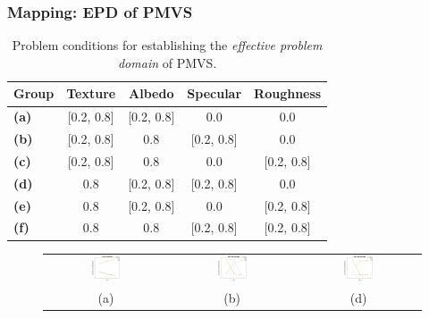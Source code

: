 \documentclass{beamer}
\begin{document}
\begin{frame}
\frametitle{Mapping: EPD of PMVS}

\begin{table}[!htbp]
  \centering
  \caption{Problem conditions for establishing the \textit{effective problem domain} of PMVS.}
  \begin{tabular}{l*{4}{c}}
  \hline
  \textbf{Group} & Texture & Albedo & Specular & Roughness\\
  \hline
  \textbf{(a)} & [0.2, 0.8] & [0.2, 0.8] & 0.0 & 0.0\\
  \textbf{(b)} & [0.2, 0.8] & 0.8 & [0.2, 0.8] & 0.0\\
  \textbf{(c)} & [0.2, 0.8] & 0.8 & 0.0 & [0.2, 0.8]\\
  \textbf{(d)} & 0.8 & [0.2, 0.8] & [0.2, 0.8] & 0.0\\
  \textbf{(e)} & 0.8 & [0.2, 0.8] & 0.0 & [0.2, 0.8]\\
  \textbf{(f)} & 0.8 & 0.8 & [0.2, 0.8] & [0.2, 0.8]\\
  \hline
  \end{tabular}
\end{table}

\begin{figure}[!htbp]
\begin{tabular}{ccc}
\includegraphics[width=0.25\textwidth]{mapping/depend_check/mvs_tex_alb}&
\includegraphics[width=0.25\textwidth]{mapping/depend_check/mvs_tex_spec}&
\includegraphics[width=0.25\textwidth]{mapping/depend_check/mvs_alb_spec}\\
(a) & (b) & (d)\\
\end{tabular}
\end{figure}

\end{frame}
\end{document}
